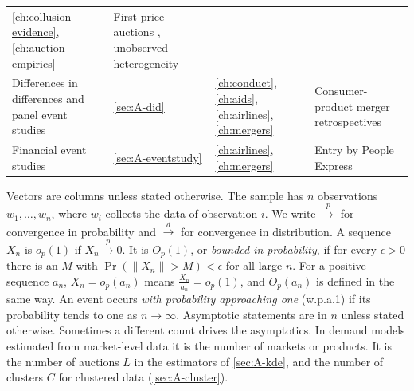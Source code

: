 \begin{table}[htbp]
\begin{tabularx}{\textwidth}{@{}>{\raggedright\arraybackslash}p{}
>{\raggedright\arraybackslash}p{} >{\raggedright\arraybackslash}p{}
>{\raggedright\arraybackslash}X@{}}
\ref{ch:collusion-evidence}, \ref{ch:auction-empirics} & First-price auctions \citep{GuerrePerrigneVuong2000},
unobserved heterogeneity \citep{Krasnokutskaya2011} \\
\addlinespace
Differences in differences and panel event studies & \ref{sec:A-did} & \ref{ch:conduct}, \ref{ch:aids},
\ref{ch:airlines}, \ref{ch:mergers} & Consumer-product merger retrospectives \citep{AshenfelterHosken2010} \\
\addlinespace
Financial event studies & \ref{sec:A-eventstudy} & \ref{ch:airlines}, \ref{ch:mergers} & Entry by People Express
\citep{WhinstonCollins1992} \\
\bottomrule
\end{tabularx}
\end{table}

Vectors are columns unless stated otherwise. The sample has $n$ observations $w_1, \dots, w_n$, where $w_i$ collects
the data of observation $i$. We write $\xrightarrow{p}$ for convergence in probability and $\xrightarrow{d}$ for
convergence in distribution. A sequence $X_n$ is $o_p(1)$ if $X_n \xrightarrow{p} 0$. It is $O_p(1)$, or
\emph{bounded in probability}, if for every $\epsilon > 0$ there is an $M$ with $\Pr(\lVert X_n\rVert > M) < \epsilon$
for all large $n$. For a positive sequence $a_n$, $X_n = o_p(a_n)$ means $\frac{X_n}{a_n} = o_p(1)$, and $O_p(a_n)$ is
defined in the same way. An event occurs \emph{with probability approaching one} (w.p.a.1) if its probability tends to
one as $n \to \infty$. Asymptotic statements are in $n$ unless stated otherwise. Sometimes a different count drives the
asymptotics. In demand models estimated from market-level data it is the number of markets or products. It is the
number of auctions $L$ in the estimators of \cref{sec:A-kde}, and the number of clusters $C$ for clustered data
(\cref{sec:A-cluster}).

